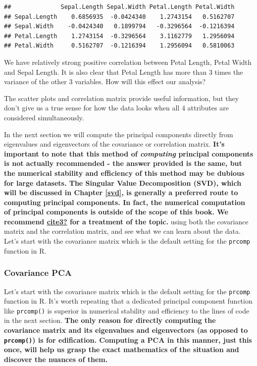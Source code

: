 \documentclass[
]{article}
\theoremstyle{definition}
\theoremstyle{definition}
\theoremstyle{definition}
\theoremstyle{definition}
\theoremstyle{remark}
\begin{document}
\begin{verbatim}
##              Sepal.Length Sepal.Width Petal.Length Petal.Width
## Sepal.Length    0.6856935  -0.0424340    1.2743154   0.5162707
## Sepal.Width    -0.0424340   0.1899794   -0.3296564  -0.1216394
## Petal.Length    1.2743154  -0.3296564    3.1162779   1.2956094
## Petal.Width     0.5162707  -0.1216394    1.2956094   0.5810063
\end{verbatim}

We have relatively strong positive correlation between Petal Length, Petal Width and Sepal Length. It is also clear that Petal Length has more than 3 times the variance of the other 3 variables. How will this effect our analysis?

The scatter plots and correlation matrix provide useful information, but they don't give us a true sense for how the data looks when all 4 attributes are considered simultaneously.

In the next section we will compute the principal components directly from eigenvalues and eigenvectors of the covariance or correlation matrix. \textbf{It's important to note that this method of \emph{computing} principal components is not actually recommended - the answer provided is the same, but the numerical stability and efficiency of this method may be dubious for large datasets. The Singular Value Decomposition (SVD), which will be discussed in Chapter \ref{svd}, is generally a preferred route to computing principal components. In fact, the numerical computation of principal components is outside of the scope of this book. We recommend \protect\hyperlink{ref-cite3}{\textbf{cite3?}} for a treatment of the topic.} using both the covariance matrix and the correlation matrix, and see what we can learn about the data. Let's start with the covariance matrix which is the default setting for the \texttt{prcomp} function in R.

\hypertarget{covariance-pca}{%
\subsubsection{Covariance PCA}\label{covariance-pca}}

Let's start with the covariance matrix which is the default setting for the \texttt{prcomp} function in R. It's worth repeating that a dedicated principal component function like \texttt{prcomp()} is superior in numerical stability and efficiency to the lines of code in the next section. \textbf{The only reason for directly computing the covariance matrix and its eigenvalues and eigenvectors (as opposed to \texttt{prcomp()}) is for edification. Computing a PCA in this manner, just this once, will help us grasp the exact mathematics of the situation and discover the nuances of them.}
\end{document}
